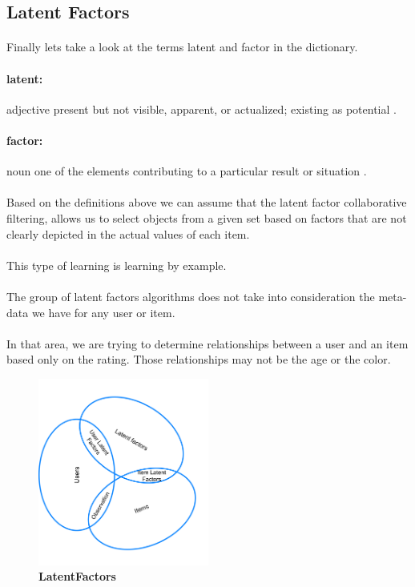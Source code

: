 \subsection{Latent Factors}
\paragraph{} Finally lets take a look at the terms latent and factor in the dictionary.
\paragraph{latent:} adjective present but not visible, apparent, or actualized; existing as potential \cite{Dictionary.com2017}.
\paragraph{factor:} noun one of the elements contributing to a particular result or situation \cite{Dictionary.com2017}.
\paragraph{} Based on the definitions above we can assume that the latent factor collaborative filtering, allows us to select objects from a given set based on factors that are not clearly depicted in the actual values of each item.
\paragraph{} This type of learning is learning by example.
\paragraph{} The group of latent factors algorithms does not take into consideration the meta-data we have for any user or item. 
\paragraph{} In that area, we are trying to determine relationships between a user and an item based only on the rating. Those relationships may not be the age or the color.

\begin{figure}[h]
	\centering
	\includegraphics[width=0.5\textwidth]{images/LatentFactors.png}
	\caption{\bfseries LatentFactors}
	\label{LatentFactors}
\end{figure}


